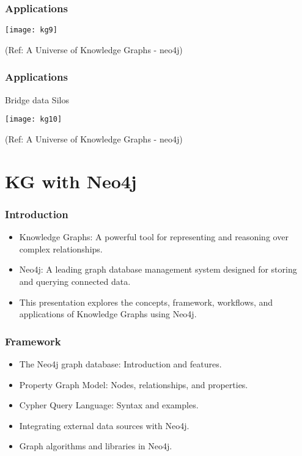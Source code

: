 \begin{frame}[fragile]\frametitle{Applications}
 
 
			\begin{center}
			\texttt{[image: kg9]}
			\end{center}	
			
			{\tiny (Ref: A Universe of Knowledge Graphs - neo4j)}
		
	
\end{frame}

\begin{frame}[fragile]\frametitle{Applications}
 
 Bridge data Silos
 
			\begin{center}
			\texttt{[image: kg10]}
			\end{center}	
			
			{\tiny (Ref: A Universe of Knowledge Graphs - neo4j)}
		
	
\end{frame}


\section{KG with Neo4j}

\begin{frame}
  \frametitle{Introduction}
  \begin{itemize}
    \item Knowledge Graphs: A powerful tool for representing and reasoning over complex relationships.
    \item Neo4j: A leading graph database management system designed for storing and querying connected data.
    \item This presentation explores the concepts, framework, workflows, and applications of Knowledge Graphs using Neo4j.
  \end{itemize}
\end{frame}

\begin{frame}
  \frametitle{Framework}
  \begin{itemize}
    \item The Neo4j graph database: Introduction and features.
    \item Property Graph Model: Nodes, relationships, and properties.
    \item Cypher Query Language: Syntax and examples.
    \item Integrating external data sources with Neo4j.
    \item Graph algorithms and libraries in Neo4j.
  \end{itemize}
\end{frame}

